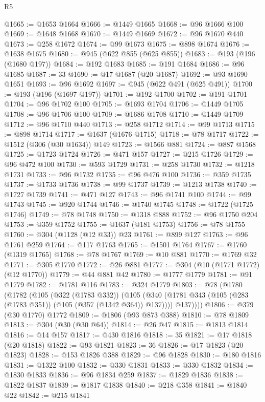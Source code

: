 \begin{lexlean}{R5}
\begin{coremodule}
@1665 := @1653 @1664
@1666 := @1449 @1665
@1668 := @96 @1666 @100
@1669 := @1648 @1668
@1670 := @1449 @1669
@1672 := @96 @1670 @440
@1673 := @258 @1672
@1674 := @99 @1673
@1675 := @898 @1674
@1676 := @1638 @1675
@1680 := @945 (@622 @855 (@625 @855))
@1683 := @193 (@196 (@1680 @197))
@1684 := @192 @1683
@1685 := @191 @1684
@1686 := @96 @1685
@1687 := 33
@1690 := @17 @1687 (@20 @1687)
@1692 := @93 @1690 @1651
@1693 := @96 @1692
@1697 := @945 (@622 @491 (@625 @491))
@1700 := @193 (@196 (@1697 @197))
@1701 := @192 @1700
@1702 := @191 @1701
@1704 := @96 @1702 @100
@1705 := @1693 @1704
@1706 := @1449 @1705
@1708 := @96 @1706 @100
@1709 := @1686 @1708
@1710 := @1449 @1709
@1712 := @96 @1710 @440
@1713 := @258 @1712
@1714 := @99 @1713
@1715 := @898 @1714
@1717 := @1637 (@1676 @1715)
@1718 := @78 @1717
@1722 := @1512 (@306 (@30 @1634)) @149
@1723 := @1566 @881
@1724 := @887 @1568
@1725 := @1723 @1724
@1726 := @471 @157
@1727 := @215 @1726
@1729 := @96 @472 @100
@1730 := @593 @1729
@1731 := @258 @1730
@1732 := @1218 @1731
@1733 := @96 @1732
@1735 := @96 @476 @100
@1736 := @359 @1735
@1737 := @1733 @1736
@1738 := @99 @1737
@1739 := @1213 @1738
@1740 := @1727 @1739
@1741 := @471 @127
@1743 := @96 @1741 @100
@1744 := @99 @1743
@1745 := @920 @1744
@1746 := @1740 @1745
@1748 := @1722 (@1725 @1746)
@1749 := @78 @1748
@1750 := @1318 @888
@1752 := @96 @1750 @204
@1753 := @359 @1752
@1755 := @1637 (@181 @1753)
@1756 := @78 @1755
@1760 := @304 (@1128 (@12 @33)) @23
@1761 := @899 @127
@1763 := @96 @1761 @259
@1764 := @117 @1763
@1765 := @1501 @1764
@1767 := @1760 (@1319 @1765)
@1768 := @78 @1767
@1769 := @10 @881
@1770 := @1769 @32
@1771 := @305 @1770
@1772 := @26 @881
@1777 := @304 (@10 (@1771 @1772) (@12 @1770))
@1779 := @44 @881 @42
@1780 := @1777 @1779
@1781 := @91 @1779
@1782 := @1781 @116
@1783 := @324 @1779
@1803 := @78
    (@1780
      (@1782
        (@105
          (@322 (@1783 @332))
          (@105
            (@340 (@1781 @343 (@105 (@283 (@1783 @351)) (@105 (@357 (@1342 @364)) @137))))
            @137))))
@1806 := @379 (@30 @1770) @1772
@1809 := @1806 (@93 @873 @388)
@1810 := @78 @1809
@1813 := @304 (@30 (@30 @64))
@1814 := @26 @47
@1815 := @1813 @1814
@1816 := @14 @157
@1817 := @430 @1816
@1818 := 35
@1821 := @17 @1818 (@20 @1818)
@1822 := @93 @1821
@1823 := 36
@1826 := @17 @1823 (@20 @1823)
@1828 := @153 @1826 @388
@1829 := @96 @1828
@1830 := @180 @1816
@1831 := @1322 @100
@1832 := @330 @1831
@1833 := @330 @1832
@1834 := @1830 @1833
@1836 := @96 @1834 @259
@1837 := @1829 @1836
@1838 := @1822 @1837
@1839 := @1817 @1838
@1840 := @218 @358
@1841 := @1840 @22
@1842 := @215 @1841

\end{coremodule}
\end{lexlean}
